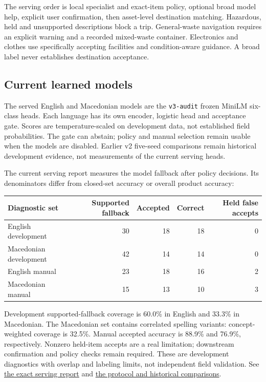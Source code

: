 \documentclass[10pt,a4paper]{article}
\newcommand{\repo}[2]{\href{https://github.com/VikiShmiki/meowchine-learning-repo/blob/main/#1}{#2}}
\newcommand{\code}[1]{\texttt{\small #1}}
\begin{document}
The serving order is local specialist and exact-item policy, optional broad model help, explicit user confirmation, then asset-level destination matching. Hazardous, held and unsupported descriptions block a trip. General-waste navigation requires an explicit warning and a recorded mixed-waste container. Electronics and clothes use specifically accepting facilities and condition-aware guidance. A broad label never establishes destination acceptance.
\subsection{Current learned models}
The served English and Macedonian models are the \code{v3-audit} frozen MiniLM six-class heads. Each language has its own encoder, logistic head and acceptance gate. Scores are temperature-scaled on development data, not established field probabilities. The gate can abstain; policy and manual selection remain usable when the models are disabled. Earlier v2 five-seed comparisons remain historical development evidence, not measurements of the current serving heads.

The current serving report measures the model fallback after policy decisions. Its denominators differ from closed-set accuracy or overall product accuracy:
\begin{center}
\small
\begin{tabularx}{\linewidth}{>{\raggedright\arraybackslash}Xrrrr}
\toprule
Diagnostic set & Supported fallback & Accepted & Correct & Held false accepts \\
\midrule
English development & 30 & 18 & 18 & 0 \\
Macedonian development & 42 & 14 & 14 & 0 \\
English manual & 23 & 18 & 16 & 2 \\
Macedonian manual & 15 & 13 & 10 & 3 \\
\bottomrule
\end{tabularx}
\end{center}
Development supported-fallback coverage is 60.0\% in English and 33.3\% in Macedonian. The Macedonian set contains correlated spelling variants: concept-weighted coverage is 32.5\%. Manual accepted accuracy is 88.9\% and 76.9\%, respectively. Nonzero held-item accepts are a real limitation; downstream confirmation and policy checks remain required. These are development diagnostics with overlap and labeling limits, not independent field validation. See \repo{data/ml/v3_audit/serving_report.json}{the exact serving report} and \repo{docs/ML.md}{the protocol and historical comparisons}.
\end{document}
